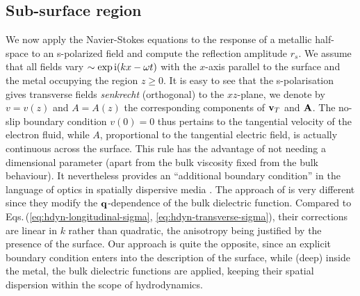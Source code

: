 \documentclass[11pt, oneside]{article}   	%
\begin{document}
\subsection{Sub-surface region}
\label{s:hydrodynamic-r|t-solution}

We now apply the Navier-Stokes equations to the response of a metallic half-space
to an s-polarized field and compute the reflection amplitude $r_s$. We assume
that all fields vary $\sim \exp{\rm i}( k x - \omega t )$ with the $x$-axis parallel
to the surface and the metal occupying the region $z \ge 0$. It is easy to see that
the s-polarisation gives transverse fields \emph{senkrecht} (orthogonal) to the $xz$-plane, 
we denote by $v = v(z)$ and $A = A(z)$ the corresponding components of ${\bf v}_{T}$ 
and ${\bf A}$. The no-slip boundary condition $v(0) = 0$ thus pertains to the
tangential velocity of the electron fluid, while $A$, proportional to the tangential
electric field, is actually continuous across the surface. 
This rule has the advantage of not
needing a dimensional parameter (apart from the bulk viscosity fixed from the bulk
behaviour). It nevertheless provides an ``additional boundary condition'' in the language
of optics in spatially dispersive media \citep{DresselGruenerBook}. 
The approach of \citet{Klimchitskaya_2020b} is very different since they modify the
${\bf q}$-dependence of the bulk dielectric function.
Compared to Eqs.\,(\ref{eq:hdyn-longitudinal-sigma}, \ref{eq:hdyn-transverse-sigma}), 
their corrections are linear in $k$ rather than quadratic, the anisotropy being justified
by the presence of the surface. Our approach is quite the opposite, 
since an explicit boundary condition enters into the description of the surface, 
while (deep) inside the metal, the bulk dielectric functions are applied,
keeping their spatial dispersion within the scope of hydrodynamics.
\end{document}
